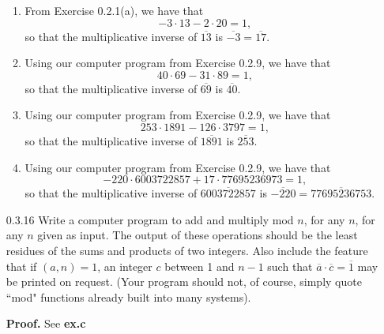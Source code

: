 \begin{enumerate}
      \begin{enumerate}
         \item From Exercise 0.2.1(a), we have that
               $$-3 \cdot 13 - 2 \cdot 20 = 1,$$
               so that the multiplicative inverse of $\overline{13}$ is
               $\overline{-3} = \overline{17}$.
         \item Using our computer program from Exercise 0.2.9, we have that
               $$40 \cdot 69 - 31 \cdot 89 = 1,$$
               so that the multiplicative inverse of $\overline{69}$ is
               $\overline{40}$.
         \item Using our computer program from Exercise 0.2.9, we have that
               $$253 \cdot 1891 - 126 \cdot 3797 = 1,$$
               so that the multiplicative inverse of $\overline{1891}$ is
               $\overline{253}$.
         \item Using our computer program from Exercise 0.2.9, we have that
               $$-220 \cdot 6003722857 + 17 \cdot 77695236973 = 1,$$
               so that the multiplicative inverse of $\overline{6003722857}$ is
               $\overline{-220} = \overline{77695236753}$.
      \end{enumerate}
   \item[0.3.16]  Write a computer program to add and multiply mod $n$, for any
                  $n$, for any $n$ given as input. The output of these
                  operations should be the least residues of the sums and 
                  products of two integers. Also include the feature that if
                  $(a, n) = 1$, an integer $c$ between 1 and $n - 1$ such that
                  $\overline{a} \cdot \overline{c} = \overline{1}$ may be
                  printed on request. (Your program should not, of course,
                  simply quote ``mod" functions already built into many
                  systems).

      \textbf{Proof.} See \textbf{ex.c}
\end{enumerate}
